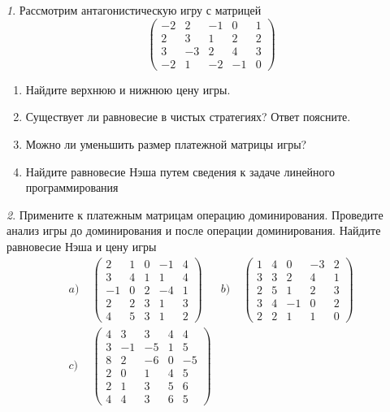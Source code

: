 \documentclass[12pt]{article}
\theoremstyle{remark}
\newtheorem{exercise}{}[subsection]
\begin{document}
\begin{exercise}
Рассмотрим антагонистическую игру с матрицей
\[
	\begin{pmatrix}
	-2 & 2 & -1 & 0 & 1 \\
	2 & 3 & 1 & 2 & 2 \\
	3 & -3 & 2 & 4 & 3 \\
	-2 & 1 & -2 & -1 & 0
	\end{pmatrix}
\]
\begin{enumerate}
	\item Найдите верхнюю и нижнюю цену игры.
	\item Существует ли равновесие в чистых стратегиях? Ответ поясните.
	\item Можно ли уменьшить размер платежной матрицы игры?
	\item Найдите равновесие Нэша путем сведения к задаче линейного
	программирования %
\end{enumerate}
\end{exercise}

\begin{exercise}
Примените к платежным матрицам операцию доминирования. Проведите анализ игры до доминирования и 
после операции доминирования. Найдите равновесие Нэша и цену игры
\begin{align*}
	a)&\;\begin{pmatrix} 2 & 1& 0 & -1 & 4 \\ 3 & 4 & 1 & 1 & 4 \\
	-1 & 0 & 2 & -4 & 1 \\ 2 & 2 & 3 & 1 & 3 \\ 4 & 5 & 3 & 1 & 2 \end{pmatrix} &
	b)&\; \begin{pmatrix} 1 & 4 & 0 & -3 & 2 \\ 3 & 3 & 2 & 4  & 1 \\ 2 & 5 & 1 & 2 & 3 \\ 
	3 & 4 & -1 & 0 & 2 \\ 2 & 2 & 1 & 1 & 0 \end{pmatrix} \\
	c)&\; \begin{pmatrix} 4 & 3 & 3 & 4 & 4 \\ 3 & -1 & -5 & 1 & 5 \\ 8 & 2 & -6 & 0 & -5 \\ 
	2 & 0 & 1 & 4 & 5 \\ 2 & 1 & 3 & 5 & 6 \\ 4 & 4 & 3 & 6 & 5 \end{pmatrix}
\end{align*}
\end{exercise}
\end{document}
